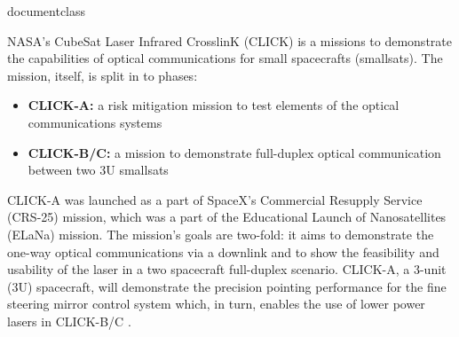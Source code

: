\csname documentclass
\usepackage[utf8x]{inputenc}
\usepackage{blindtext}
\usepackage{float}
\usepackage{graphicx}
\usepackage{siunitx}
\usepackage{cite}



NASA's CubeSat Laser Infrared CrosslinK (CLICK) is a missions to demonstrate the capabilities of optical communications for small spacecrafts (smallsats). The mission, itself, is split in to phases:
\begin{itemize}
    \item \textbf{CLICK-A:} a risk mitigation mission to test elements of the optical communications systems \cite{click_1}
    \item \textbf{CLICK-B/C:} a mission to demonstrate full-duplex optical communication between two 3U smallsats \cite{click_1}
\end{itemize}
CLICK-A was launched as a part of SpaceX's Commercial Resupply Service (CRS-25) mission, which was a part of the Educational Launch of Nanosatellites (ELaNa) mission.
The mission's goals are two-fold: it aims to demonstrate the one-way optical communications via a downlink and to show the feasibility and usability of the laser in a two spacecraft full-duplex scenario.
CLICK-A, a 3-unit (3U) spacecraft, will demonstrate the precision pointing performance for the fine steering mirror control system which, in turn, enables the use
of lower power lasers in CLICK-B/C \cite{caldwell_nasa-supported_2022}.

